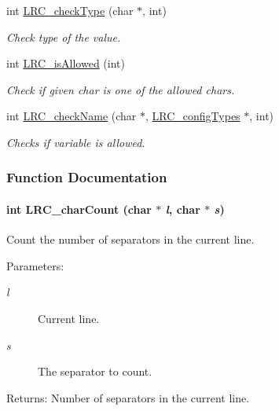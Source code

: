 \begin{CompactItemize}
int \hyperlink{group___l_r_c__internals_g727eec2e862e3acf7206d11cd2636127}{LRC\_\-checkType} (char $\ast$, int)
\begin{CompactList}\small\item\em Check type of the value. \item\end{CompactList}\item 
int \hyperlink{group___l_r_c__internals_g6ac7bc617b346047519f4c3589a311bd}{LRC\_\-isAllowed} (int)
\begin{CompactList}\small\item\em Check if given char is one of the allowed chars. \item\end{CompactList}\item 
int \hyperlink{group___l_r_c__internals_g40dad9664f69eed3491f5753db5a76b0}{LRC\_\-checkName} (char $\ast$, \hyperlink{struct_l_r_c__config_types}{LRC\_\-configTypes} $\ast$, int)
\begin{CompactList}\small\item\em Checks if variable is allowed. \item\end{CompactList}\end{CompactItemize}


\subsubsection{Function Documentation}
\hypertarget{group___l_r_c__internals_gadc8707a894b997457d320923c940721}{
\paragraph[{LRC\_\-charCount}]{\setlength{\rightskip}{0pt plus 5cm}int LRC\_\-charCount (char $\ast$ {\em l}, \/  char $\ast$ {\em s})}\hfill}
\label{group___l_r_c__internals_gadc8707a894b997457d320923c940721}


Count the number of separators in the current line. 

\begin{Desc}
\item[Parameters:]
\begin{description}
\item[{\em l}]Current line.\item[{\em s}]The separator to count.\end{description}
\end{Desc}
\begin{Desc}
\item[Returns:]Number of separators in the current line. \end{Desc}


